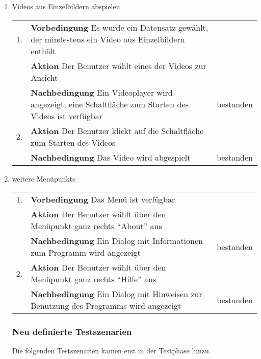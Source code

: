 \begin{enumerate} [label=\bfseries /TS \arabic*0/, leftmargin=*]
	\item Videos aus Einzelbildern abspielen \newline \newline
	\begin{tabular}{@{}rp{4in}|l}
	1. & \textbf{Vorbedingung} Es wurde ein Datensatz gewählt, der mindestens ein Video aus Einzelbildern enthält & \\
	   & \textbf{Aktion} Der Benutzer wählt eines der Videos zur Ansicht & \\
	   & \textbf{Nachbedingung} Ein Videoplayer wird angezeigt; eine Schaltfläche zum Starten des Videos ist verfügbar & bestanden \\
	\hline
	2. & \textbf{Aktion} Der Benutzer klickt auf die Schaltfläche zum Starten des Videos & \\
	   & \textbf{Nachbedingung} Das Video wird abgespielt & bestanden \\
	\end{tabular}
	\newpage

	\item weitere Menüpunkte \newline \newline
	\begin{tabular}{@{}rp{4in}|l}
	1. & \textbf{Vorbedingung} Das Menü ist verfügbar & \\
	   & \textbf{Aktion} Der Benutzer wählt über den Menüpunkt ganz rechts \enquote{About} aus & \\
	   & \textbf{Nachbedingung} Ein Dialog mit Informationen zum Programm wird angezeigt & bestanden \\
	\hline
	2. & \textbf{Aktion} Der Benutzer wählt über den Menüpunkt ganz rechts \enquote{Hilfe} aus & \\
	   & \textbf{Nachbedingung} Ein Dialog mit Hinweisen zur Benutzung des Programms wird angezeigt & bestanden \\
	\end{tabular}
	\newline

	\newpage
\subsubsection{Neu definierte Testszenarien}
	Die folgenden Testszenarien kamen erst in der Testphase hinzu.


\end{enumerate}
